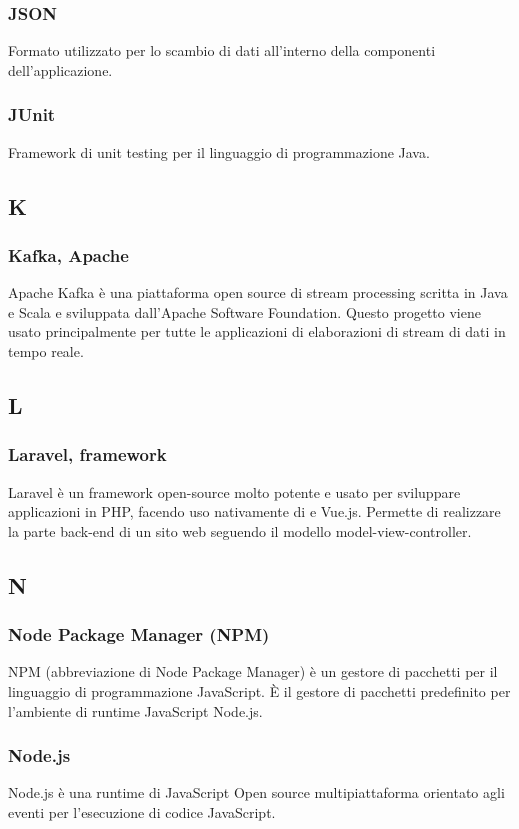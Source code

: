 \subsubsection{JSON}
Formato utilizzato per lo scambio di dati all'interno della componenti dell'applicazione.
\subsubsection{JUnit}
Framework di unit testing per il linguaggio di programmazione Java.
\subsection{K}
\subsubsection{Kafka, Apache}  Apache Kafka è una piattaforma open source di stream processing scritta in Java e Scala e sviluppata dall'Apache Software Foundation.  Questo progetto viene usato principalmente per tutte le applicazioni di elaborazioni di stream di dati in tempo reale.
\subsection{L}
\subsubsection{Laravel, framework}  Laravel è un framework open-source molto potente e usato per sviluppare applicazioni in PHP, facendo uso nativamente di  e Vue.js. Permette di realizzare la parte back-end di un sito web seguendo il modello model-view-controller. 
\subsection{N}
\subsubsection{Node Package Manager (NPM)}  NPM (abbreviazione di Node Package Manager) è un gestore di pacchetti per il linguaggio di programmazione JavaScript. È il gestore di pacchetti predefinito per l'ambiente di runtime JavaScript Node.js.
\subsubsection{Node.js}  Node.js è una runtime di JavaScript Open source multipiattaforma orientato agli eventi per l'esecuzione di codice JavaScript.
